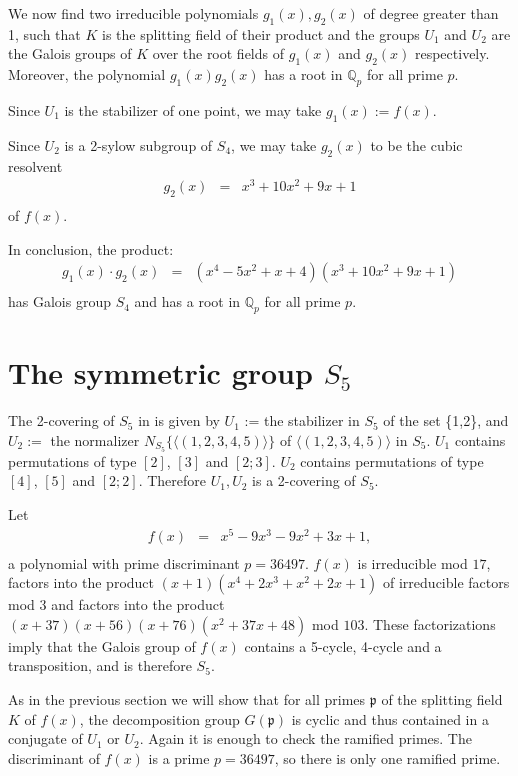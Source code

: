 \documentclass[reqno,12pt]{amsart}
\theoremstyle{remark}
\theoremstyle{definition}
\theoremstyle{citing}
\numberwithin{theorem}{section}
\numberwithin{equation}{section}
\begin{document}
We now find two irreducible polynomials $g_{1}(x),g_{2}(x)$
of degree greater than 1, such that
$K$ is the splitting field of their product and the groups $U_{1}$
and $U_{2}$ are the Galois groups of $K$ over the root fields of $g_{1}(x)$
and $g_{2}(x)$ respectively. Moreover, the polynomial $g_{1}(x)g_{2}(x)$
has a root in $\mathbb{Q}_{p}$ for all prime $p$.

Since $U_{1}$ is the stabilizer of one point, we may take $g_1(x):=f(x)$.

Since $U_{2}$ is a 2-sylow subgroup of $S_4$, we may take $g_{2}(x)$ to be
the cubic resolvent \begin{eqnarray*}
g_{2}(x) & = & x^{3}+10x^{2}+9x+1\\
\end{eqnarray*} of $f(x)$.

In conclusion, the product:\begin{eqnarray*}
g_{1}(x)\cdot g_{2}(x) & = & (x^{4}-5x^{2}+x+4)(x^{3}+10x^{2}+9x+1)\\
\end{eqnarray*}
has Galois group $S_{4}$ and has a root in $\mathbb{Q}_{p}$ for
all prime $p$.

\section{The symmetric group $S_{5}$}

The 2-covering of $S_{5}$ in \cite{BBH} is given
by $U_{1}$ := the stabilizer in $S_{5}$ of the set \{1,2\},
and $U_{2}:=$ the normalizer $N_{S_{5}}\{\langle(1,2,3,4,5)\rangle\}$ of $\langle(1,2,3,4,5)\rangle$ in $S_5$.  $U_{1}$
contains permutations of type $[2]$, $[3]$ and $[2;3]$.
$U_{2}$ contains  permutations of type $[4]$, $[5]$ and $[2;2]$.
Therefore $U_1,U_2$ is a 2-covering of $S_5$.

Let \begin{eqnarray*}
f(x) & = & x^{5}-9x^{3}-9x^{2}+3x+1,\\
\end{eqnarray*}
a polynomial with prime discriminant $p=36497$.
 $f(x)$ is irreducible mod
$17$, factors into the product $(x+1)(x^{4}+2x^{3}+x^{2}+2x+1)$
of irreducible factors mod $3$ and factors into the product $(x+37)(x+56)(x+76)(x^{2}+37x+48)$
mod $103$. These factorizations imply that the Galois group of $f(x)$
contains a 5-cycle, 4-cycle and a transposition, and is therefore
$S_{5}$.

As in the previous section we will show
that for all primes $\mathfrak{p}$ of the splitting field $K$ of $f(x)$, the decomposition group
$G(\mathfrak{p})$ is cyclic and thus contained in a conjugate of
$U_{1}$ or $U_{2}$. Again it is enough to check the ramified primes.   The discriminant of $f(x)$ is a prime $p=36497$, so there is only one ramified prime.
\end{document}
